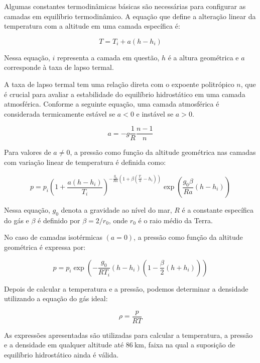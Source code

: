 Algumas constantes termodinâmicas básicas são necessárias para configurar as camadas em equilíbrio termodinâmico. A equação que define a alteração linear da temperatura com a altitude em uma camada específica é:

\begin{equation}
T=T_{i}+a\left(h-h_{i}\right)
\end{equation}

Nessa equação, $i$ representa a camada em questão, $h$ é a altura geométrica e $a$ corresponde à taxa de lapso termal.

A taxa de lapso termal tem uma relação direta com o expoente politrópico $n$, que é crucial para avaliar a estabilidade do equilíbrio hidrostático em uma camada atmosférica. Conforme a seguinte equação, uma camada atmosférica é considerada termicamente estável se $a<0$ e instável se $a>0$.

\begin{equation}
a=-g \frac{1}{R} \frac{n-1}{n}
\end{equation}

Para valores de $a \neq 0$, a pressão como função da altitude geométrica nas camadas com variação linear de temperatura é definida como:

\begin{equation}
p=p_{i}\left(1+\frac{a\left(h-h_{i}\right)}{T_{i}}\right)^{-\frac{g_{0}}{R a}\left(1+\beta\left(\frac{T_{i}}{a}-h_{i}\right)\right)} \exp \left(\frac{g_{0} \beta}{R a}\left(h-h_{i}\right)\right)
\end{equation}

Nessa equação, $g_{0}$ denota a gravidade ao nível do mar, $R$ é a constante específica do gás e $\beta$ é definido por $\beta=2 / r_{0}$, onde $r_{0}$ é o raio médio da Terra.

No caso de camadas isotérmicas $(a=0)$, a pressão como função da altitude geométrica é expressa por:

\begin{equation}
p=p_{i} \exp \left(-\frac{g_{0}}{R T_{i}}\left(h-h_{i}\right)\left(1-\frac{\beta}{2}\left(h+h_{i}\right)\right)\right)
\end{equation}

Depois de calcular a temperatura e a pressão, podemos determinar a densidade utilizando a equação do gás ideal:

\begin{equation}
\rho=\frac{p}{R T}
\end{equation}

As expressões apresentadas são utilizadas para calcular a temperatura, a pressão e a densidade em qualquer altitude até $86 \mathrm{~km}$, faixa na qual a suposição de equilíbrio hidrostático ainda é válida.

